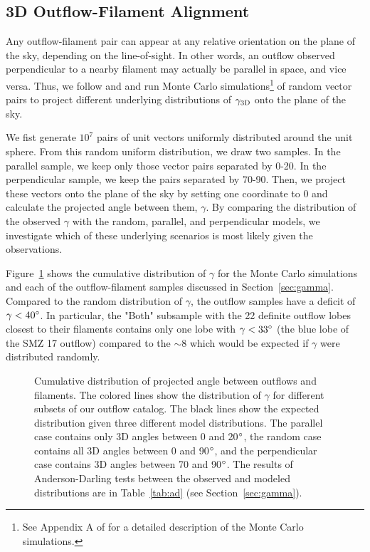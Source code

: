 \documentclass[twocolumn]{aastex63}
\begin{document}
\subsection{3D Outflow-Filament Alignment}
Any outflow-filament pair can appear at any relative orientation on the plane of the sky, depending on the line-of-sight. In other words, an outflow observed perpendicular to a nearby filament may actually be parallel in space, and vice versa. Thus, we follow \citet{Stephens17} and \citet{Kong19} and run Monte Carlo simulations\footnote{See Appendix A of \citet{Stephens17} for a detailed description of the Monte Carlo simulations.} of random vector pairs to project different underlying distributions of $\gamma_{\rm 3D}$ onto the plane of the sky.

We fist generate $10^7$ pairs of unit vectors uniformly distributed around the unit sphere. From this random uniform distribution, we draw two samples. In the parallel sample, we keep only those vector pairs separated by 0-20\degr. In the perpendicular sample, we keep the pairs separated by 70-90\degr. Then, we project these vectors onto the plane of the sky by setting one coordinate to 0 and calculate the projected angle between them, $\gamma$. By comparing the distribution of the observed $\gamma$ with the random, parallel, and perpendicular models, we investigate which of these underlying scenarios is most likely given the observations.

Figure~\ref{fig:gamma_cdf} shows the cumulative distribution of $\gamma$ for the Monte Carlo simulations and each of the outflow-filament samples discussed in Section~\ref{sec:gamma}. Compared to the random distribution of $\gamma$, the outflow samples have a deficit of $\gamma < 40\mbox{$^\circ$}$. In particular, the "Both" subsample with the 22 definite outflow lobes closest to their filaments contains only one lobe with $\gamma < 33\mbox{$^\circ$}$ (the blue lobe of the SMZ 17 outflow) compared to the $\sim8$ which would be expected if $\gamma$ were distributed randomly.

\begin{figure}
\caption{Cumulative distribution of projected angle between outflows and filaments. The colored lines show the distribution of $\gamma$ for different subsets of our outflow catalog. The black lines show the expected distribution given three different model distributions. The parallel case contains only 3D angles between 0 and 20$\mbox{$^\circ$}$, the random case contains all 3D angles between 0 and 90$\mbox{$^\circ$}$, and the perpendicular case contains 3D angles between 70 and 90$\mbox{$^\circ$}$. The results of Anderson-Darling tests between the observed and modeled distributions are in Table~\ref{tab:ad} (see Section~\ref{sec:gamma}).\label{fig:gamma_cdf}}
\end{figure}
\end{document}
